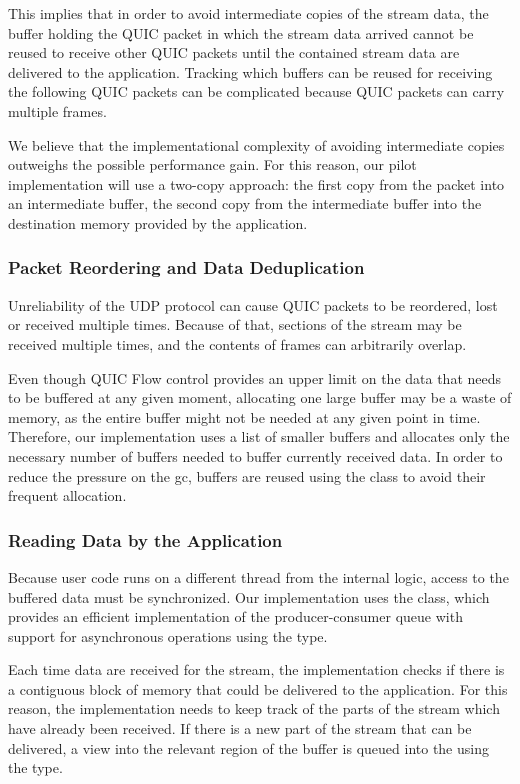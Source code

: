 This implies that in order to avoid intermediate copies of the stream data, the buffer holding the
QUIC packet in which the stream data arrived cannot be reused to receive other QUIC packets until
the contained stream data are delivered to the application. Tracking which buffers can be reused for
receiving the following QUIC packets can be complicated because QUIC packets can carry multiple
\STREAM{} frames.

We believe that the implementational complexity of avoiding intermediate copies outweighs the
possible performance gain. For this reason, our pilot implementation will use a two-copy approach:
the first copy from the packet into an intermediate buffer, the second copy from the intermediate
buffer into the destination memory provided by the application.

\subsubsection{Packet Reordering and Data Deduplication}

Unreliability of the UDP protocol can cause QUIC packets to be reordered, lost or received multiple
times. Because of that, sections of the stream may be received multiple times, and the contents of
\STREAM{} frames can arbitrarily overlap.

Even though QUIC Flow control provides an upper limit on the data that needs to be buffered at any
given moment, allocating one large buffer may be a waste of memory, as the entire buffer might not
be needed at any given point in time. Therefore, our implementation uses a list of smaller buffers
and allocates only the necessary number of buffers needed to buffer currently received data. In
order to reduce the pressure on the \gls{gc}, buffers are reused using the \ArrayPoolOf{\Byte{}}
class to avoid their frequent allocation.

\subsubsection{Reading Data by the Application}

Because user code runs on a different thread from the internal \QuicConnection{} logic, access to
the buffered data must be synchronized. Our implementation uses the \ChannelOf{} class, which
provides an efficient implementation of the producer-consumer queue with support for asynchronous
operations using the \ValueTaskOf{} type.

Each time data are received for the stream, the implementation checks if there is a contiguous block
of memory that could be delivered to the application. For this reason, the implementation needs to
keep track of the parts of the stream which have already been received. If there is a new part of
the stream that can be delivered, a view into the relevant region of the buffer is queued into the
\ChannelOf{} using the \MemoryOf{\Byte{}} type.

